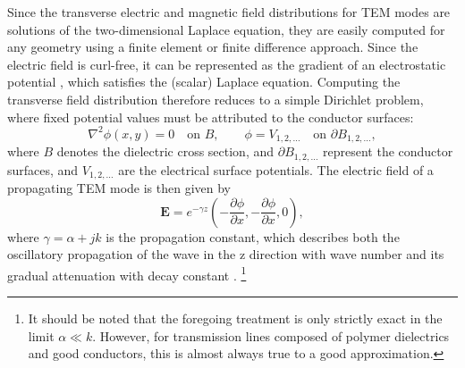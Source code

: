 Since the transverse electric and magnetic field distributions for TEM
modes are solutions of the two-dimensional Laplace equation, they are
easily computed for any geometry using a finite element or finite
difference approach. Since the electric field is
curl-free, it can be represented as the gradient of an
electrostatic potential , which  satisfies the (scalar) Laplace
equation. Computing the transverse field distribution therefore reduces
to a simple Dirichlet problem, where fixed potential values must be
attributed to the conductor surfaces:
%
\begin{equation}
\nabla^2 \phi(x,y)=0 \quad\text{on }B, \qquad \phi=V_{1,2,\dots}\quad\text{on } \partial B_{1,2,\dots}, 
\end{equation}
where $B$ denotes the dielectric cross section, and $\partial B_{1,2,\dots}$
represent the conductor surfaces, and $V_{1,2,\dots}$ are the electrical
surface potentials.
The electric field of a propagating TEM mode is then given by
\begin{equation}
	\mathbf{E}=e^{-\gamma z} \left(-\frac{\partial\phi}{\partial x}, -\frac{\partial\phi}{\partial x},0\right),
\end{equation}
where $\gamma=\alpha+j k$ is the propagation constant, which describes both
the oscillatory propagation of the wave in the z direction with wave
number  and its gradual attenuation with decay constant \m{\alpha}.
\footnote{It should be noted that the foregoing treatment is only strictly exact in the 
limit $\alpha \ll k$. However, for transmission lines composed of polymer
dielectrics and good conductors, this is almost always true to a 
good approximation.}

